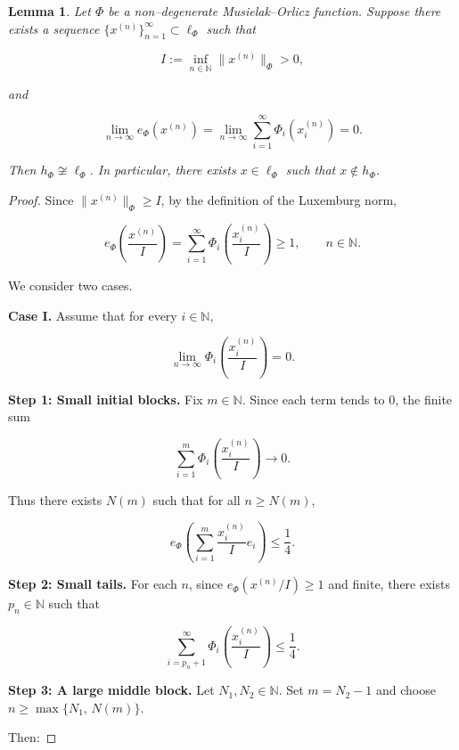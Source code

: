 \documentclass[12pt]{article}
\theoremstyle{thmstyleone}%
\newtheorem{lemma}[theorem]{Lemma}
\theoremstyle{thmstyletwo}%
\theoremstyle{thmstylethree}%
\begin{document}
{%
\begin{lemma}\label{lemma:8A}
Let $\Phi$ be a non--degenerate Musielak--Orlicz function.  
Suppose there exists a sequence $\{x^{(n)}\}_{n=1}^\infty \subset \ell_\Phi$ such that


\[
I := \inf_{n\in\mathbb N} \|x^{(n)}\|_\Phi > 0,
\]


and


\[
\lim_{n\to\infty} e_\Phi(x^{(n)})
= \lim_{n\to\infty} \sum_{i=1}^\infty \Phi_i\!\left(x^{(n)}_i\right)
= 0.
\tag{9}
\]


Then $h_\Phi \not\cong \ell_\Phi$.  
In particular, there exists $x\in \ell_\Phi$ such that $x\notin h_\Phi$.
\end{lemma}


\begin{proof}
{%
Since $\|x^{(n)}\|_\Phi \ge I$, by the definition of the Luxemburg norm,


\[
e_\Phi\!\left(\frac{x^{(n)}}{I}\right)
= \sum_{i=1}^\infty \Phi_i\!\left(\frac{x^{(n)}_i}{I}\right)
\ge 1,
\qquad n\in\mathbb N.
\tag{10}
\]



We consider two cases.

\medskip
\noindent
\textbf{Case I.}  
Assume that for every $i\in\mathbb N$,


\[
\lim_{n\to\infty}
\Phi_i\!\left(\frac{x^{(n)}_i}{I}\right) = 0.
\]



\medskip
\textbf{Step 1: Small initial blocks.}
Fix $m\in\mathbb N$.  
Since each term tends to $0$, the finite sum


\[
\sum_{i=1}^m \Phi_i\!\left(\frac{x^{(n)}_i}{I}\right)
\to 0.
\]


Thus there exists $N(m)$ such that for all $n\ge N(m)$,


\[
e_\Phi\!\left(\sum_{i=1}^m \frac{x^{(n)}_i}{I} e_i\right)
\le \frac14.
\tag{11}
\]



\medskip
\textbf{Step 2: Small tails.}
For each $n$, since $e_\Phi(x^{(n)}/I)\ge 1$ and finite,  
there exists $p_n\in\mathbb N$ such that


\[
\sum_{i=p_n+1}^\infty 
\Phi_i\!\left(\frac{x^{(n)}_i}{I}\right)
\le \frac14.
\tag{13}
\]



\medskip
\textbf{Step 3: A large middle block.}
Let $N_1,N_2\in\mathbb N$.  
Set $m=N_2-1$ and choose $n\ge \max\{N_1,\,N(m)\}$.

Then:

}
\end{proof}}
\end{document}
